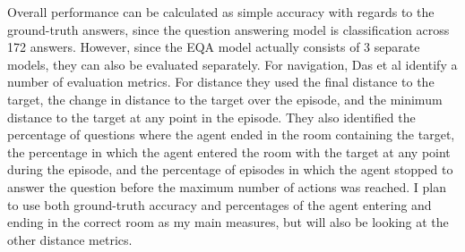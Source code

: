 \documentclass{article}
\begin{document}
Overall performance can be calculated as simple accuracy with regards to the ground-truth answers, since the question answering model is classification across 172 answers. However, since the EQA model actually consists of 3 separate models, they can also be evaluated separately. For navigation, Das et al identify a number of evaluation metrics. For distance they used the final distance to the target, the change in distance to the target over the episode, and the minimum distance to the target at any point in the episode. They also identified the percentage of questions %
where the agent ended in the room containing the target, the percentage in which the agent entered the room with the target at any point during the episode, and the percentage of episodes in which the agent stopped to answer the question before the maximum number of actions was reached. I plan to use both ground-truth accuracy and percentages of the agent entering and ending in the correct room as my main measures, but will also be looking at the other distance metrics. 





\end{document}
